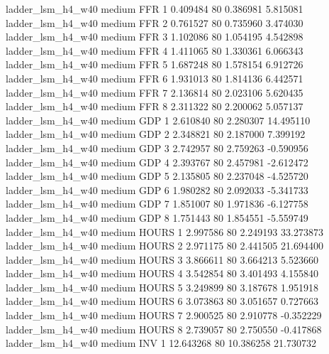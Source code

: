   ladder_lsm_h4_w40     medium      FFR                 1  0.409484 80       0.386981           5.815081
  ladder_lsm_h4_w40     medium      FFR                 2  0.761527 80       0.735960           3.474030
  ladder_lsm_h4_w40     medium      FFR                 3  1.102086 80       1.054195           4.542898
  ladder_lsm_h4_w40     medium      FFR                 4  1.411065 80       1.330361           6.066343
  ladder_lsm_h4_w40     medium      FFR                 5  1.687248 80       1.578154           6.912726
  ladder_lsm_h4_w40     medium      FFR                 6  1.931013 80       1.814136           6.442571
  ladder_lsm_h4_w40     medium      FFR                 7  2.136814 80       2.023106           5.620435
  ladder_lsm_h4_w40     medium      FFR                 8  2.311322 80       2.200062           5.057137
  ladder_lsm_h4_w40     medium      GDP                 1  2.610840 80       2.280307          14.495110
  ladder_lsm_h4_w40     medium      GDP                 2  2.348821 80       2.187000           7.399192
  ladder_lsm_h4_w40     medium      GDP                 3  2.742957 80       2.759263          -0.590956
  ladder_lsm_h4_w40     medium      GDP                 4  2.393767 80       2.457981          -2.612472
  ladder_lsm_h4_w40     medium      GDP                 5  2.135805 80       2.237048          -4.525720
  ladder_lsm_h4_w40     medium      GDP                 6  1.980282 80       2.092033          -5.341733
  ladder_lsm_h4_w40     medium      GDP                 7  1.851007 80       1.971836          -6.127758
  ladder_lsm_h4_w40     medium      GDP                 8  1.751443 80       1.854551          -5.559749
  ladder_lsm_h4_w40     medium    HOURS                 1  2.997586 80       2.249193          33.273873
  ladder_lsm_h4_w40     medium    HOURS                 2  2.971175 80       2.441505          21.694400
  ladder_lsm_h4_w40     medium    HOURS                 3  3.866611 80       3.664213           5.523660
  ladder_lsm_h4_w40     medium    HOURS                 4  3.542854 80       3.401493           4.155840
  ladder_lsm_h4_w40     medium    HOURS                 5  3.249899 80       3.187678           1.951918
  ladder_lsm_h4_w40     medium    HOURS                 6  3.073863 80       3.051657           0.727663
  ladder_lsm_h4_w40     medium    HOURS                 7  2.900525 80       2.910778          -0.352229
  ladder_lsm_h4_w40     medium    HOURS                 8  2.739057 80       2.750550          -0.417868
  ladder_lsm_h4_w40     medium      INV                 1 12.643268 80      10.386258          21.730732

